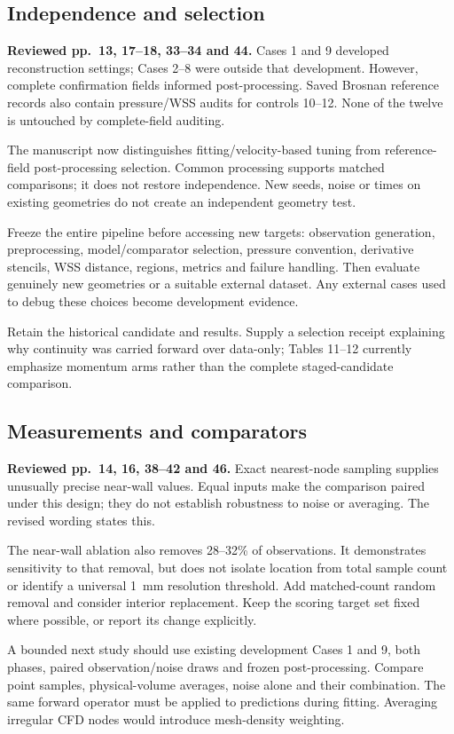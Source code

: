 \documentclass[11pt,a4paper]{article}
\begin{document}
\subsection{Independence and selection}

\textbf{Reviewed pp.~13, 17--18, 33--34 and 44.} Cases 1 and 9 developed reconstruction settings; Cases 2--8 were outside that development. However, complete confirmation fields informed post-processing. Saved Brosnan reference records also contain pressure/WSS audits for controls 10--12. None of the twelve is untouched by complete-field auditing.

The manuscript now distinguishes fitting/velocity-based tuning from reference-field post-processing selection. Common processing supports matched comparisons; it does not restore independence. New seeds, noise or times on existing geometries do not create an independent geometry test.

Freeze the entire pipeline before accessing new targets: observation generation, preprocessing, model/comparator selection, pressure convention, derivative stencils, WSS distance, regions, metrics and failure handling. Then evaluate genuinely new geometries or a suitable external dataset. Any external cases used to debug these choices become development evidence.

Retain the historical candidate and results. Supply a selection receipt explaining why continuity was carried forward over data-only; Tables 11--12 currently emphasize momentum arms rather than the complete staged-candidate comparison.

\subsection{Measurements and comparators}

\textbf{Reviewed pp.~14, 16, 38--42 and 46.} Exact nearest-node sampling supplies unusually precise near-wall values. Equal inputs make the comparison paired under this design; they do not establish robustness to noise or averaging. The revised wording states this.

The near-wall ablation also removes 28--32\% of observations. It demonstrates sensitivity to that removal, but does not isolate location from total sample count or identify a universal 1~mm resolution threshold. Add matched-count random removal and consider interior replacement. Keep the scoring target set fixed where possible, or report its change explicitly.

A bounded next study should use existing development Cases 1 and 9, both phases, paired observation/noise draws and frozen post-processing. Compare point samples, physical-volume averages, noise alone and their combination. The same forward operator must be applied to predictions during fitting. Averaging irregular CFD nodes would introduce mesh-density weighting.
\end{document}
